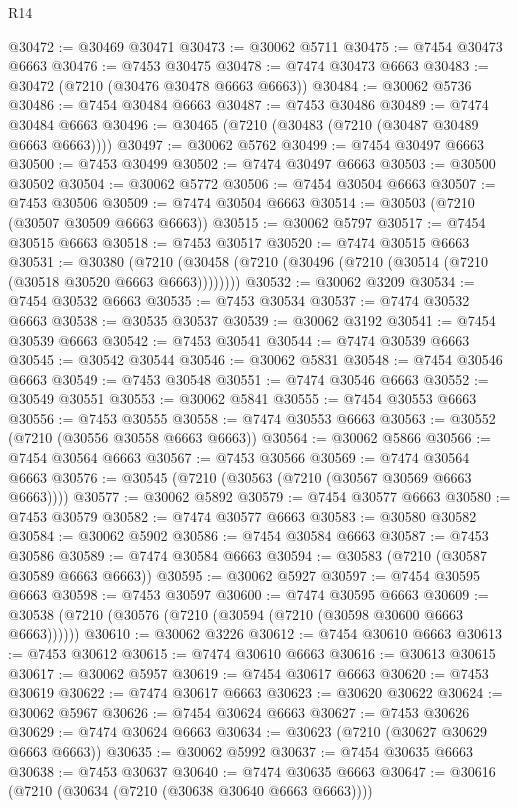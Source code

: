 \begin{lexlean}{R14}
\begin{coremodule}
@30472 := @30469 @30471
@30473 := @30062 @5711
@30475 := @7454 @30473 @6663
@30476 := @7453 @30475
@30478 := @7474 @30473 @6663
@30483 := @30472 (@7210 (@30476 @30478 @6663 @6663))
@30484 := @30062 @5736
@30486 := @7454 @30484 @6663
@30487 := @7453 @30486
@30489 := @7474 @30484 @6663
@30496 := @30465 (@7210 (@30483 (@7210 (@30487 @30489 @6663 @6663))))
@30497 := @30062 @5762
@30499 := @7454 @30497 @6663
@30500 := @7453 @30499
@30502 := @7474 @30497 @6663
@30503 := @30500 @30502
@30504 := @30062 @5772
@30506 := @7454 @30504 @6663
@30507 := @7453 @30506
@30509 := @7474 @30504 @6663
@30514 := @30503 (@7210 (@30507 @30509 @6663 @6663))
@30515 := @30062 @5797
@30517 := @7454 @30515 @6663
@30518 := @7453 @30517
@30520 := @7474 @30515 @6663
@30531 := @30380
    (@7210 (@30458 (@7210 (@30496 (@7210 (@30514 (@7210 (@30518 @30520 @6663 @6663))))))))
@30532 := @30062 @3209
@30534 := @7454 @30532 @6663
@30535 := @7453 @30534
@30537 := @7474 @30532 @6663
@30538 := @30535 @30537
@30539 := @30062 @3192
@30541 := @7454 @30539 @6663
@30542 := @7453 @30541
@30544 := @7474 @30539 @6663
@30545 := @30542 @30544
@30546 := @30062 @5831
@30548 := @7454 @30546 @6663
@30549 := @7453 @30548
@30551 := @7474 @30546 @6663
@30552 := @30549 @30551
@30553 := @30062 @5841
@30555 := @7454 @30553 @6663
@30556 := @7453 @30555
@30558 := @7474 @30553 @6663
@30563 := @30552 (@7210 (@30556 @30558 @6663 @6663))
@30564 := @30062 @5866
@30566 := @7454 @30564 @6663
@30567 := @7453 @30566
@30569 := @7474 @30564 @6663
@30576 := @30545 (@7210 (@30563 (@7210 (@30567 @30569 @6663 @6663))))
@30577 := @30062 @5892
@30579 := @7454 @30577 @6663
@30580 := @7453 @30579
@30582 := @7474 @30577 @6663
@30583 := @30580 @30582
@30584 := @30062 @5902
@30586 := @7454 @30584 @6663
@30587 := @7453 @30586
@30589 := @7474 @30584 @6663
@30594 := @30583 (@7210 (@30587 @30589 @6663 @6663))
@30595 := @30062 @5927
@30597 := @7454 @30595 @6663
@30598 := @7453 @30597
@30600 := @7474 @30595 @6663
@30609 := @30538 (@7210 (@30576 (@7210 (@30594 (@7210 (@30598 @30600 @6663 @6663))))))
@30610 := @30062 @3226
@30612 := @7454 @30610 @6663
@30613 := @7453 @30612
@30615 := @7474 @30610 @6663
@30616 := @30613 @30615
@30617 := @30062 @5957
@30619 := @7454 @30617 @6663
@30620 := @7453 @30619
@30622 := @7474 @30617 @6663
@30623 := @30620 @30622
@30624 := @30062 @5967
@30626 := @7454 @30624 @6663
@30627 := @7453 @30626
@30629 := @7474 @30624 @6663
@30634 := @30623 (@7210 (@30627 @30629 @6663 @6663))
@30635 := @30062 @5992
@30637 := @7454 @30635 @6663
@30638 := @7453 @30637
@30640 := @7474 @30635 @6663
@30647 := @30616 (@7210 (@30634 (@7210 (@30638 @30640 @6663 @6663))))

\end{coremodule}
\end{lexlean}
